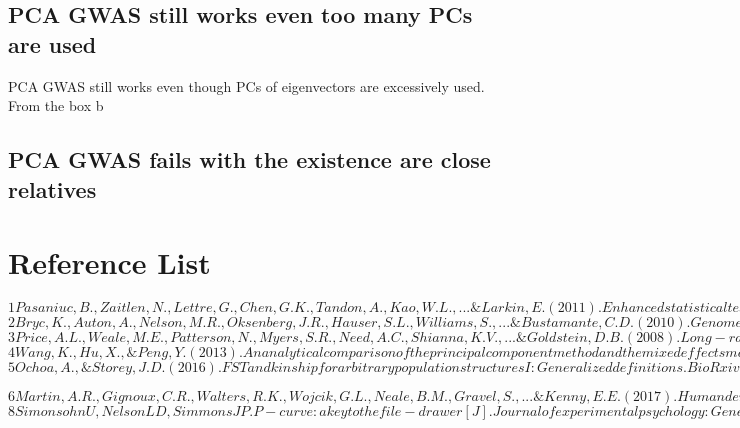 \documentclass[12pt]{article}
\begin{document}
\subsection{PCA GWAS still works even too many PCs are used}
PCA GWAS still works even though PCs of eigenvectors are excessively used. From the box b



\subsection{PCA GWAS fails with the existence are close relatives }



\section{Reference List}
$
1
Pasaniuc, B., Zaitlen, N., Lettre, G., Chen, G. K., Tandon, A., Kao, W. L., ... \& Larkin, E. (2011). Enhanced statistical tests for GWAS in admixed populations: assessment using African Americans from CARe and a Breast Cancer Consortium. PLoS genetics, 7(4), e1001371.
$\\

$
2
Bryc, K., Auton, A., Nelson, M. R., Oksenberg, J. R., Hauser, S. L., Williams, S., ... \& Bustamante, C. D. (2010). Genome-wide patterns of population structure and admixture in West Africans and African Americans. Proceedings of the National Academy of Sciences, 107(2), 786-791.
$\\

$
3
Price, A. L., Weale, M. E., Patterson, N., Myers, S. R., Need, A. C., Shianna, K. V., ... \& Goldstein, D. B. (2008). Long-range LD can confound genome scans in admixed populations. The American Journal of Human Genetics, 83(1), 132-135.
$\\

$
4
Wang, K., Hu, X., \& Peng, Y. (2013). An analytical comparison of the principal component method and the mixed effects model for association studies in the presence of cryptic relatedness and population stratification. Human heredity, 76(1), 1-9.
$\\



$
5
Ochoa, A., \& Storey, J. D. (2016). FST and kinship for arbitrary population structures I: Generalized definitions. BioRxiv, 083915.
$

$
6
Martin, A. R., Gignoux, C. R., Walters, R. K., Wojcik, G. L., Neale, B. M., Gravel, S., ... \& Kenny, E. E. (2017). Human demographic history impacts genetic risk prediction across diverse populations. The American Journal of Human Genetics, 100(4), 635-649.
$\\



$
8
Simonsohn U, Nelson L D, Simmons J P. P-curve: a key to the file-drawer[J]. Journal of experimental psychology: General, 2014, 143(2): 534.
$
\end{document}
